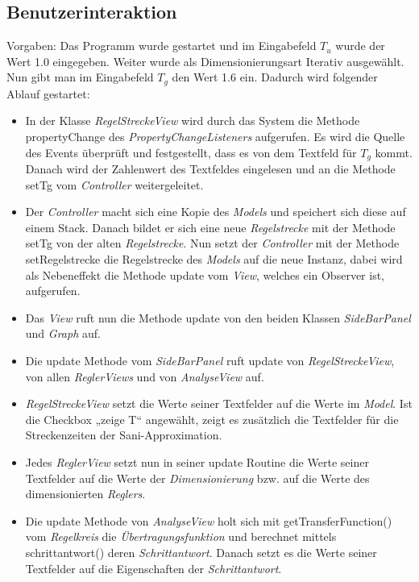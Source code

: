 \subsection{Benutzerinteraktion}
Vorgaben: Das Programm wurde gestartet und im Eingabefeld $T_u$ wurde der Wert 1.0 eingegeben. Weiter wurde als Dimensionierungsart Iterativ ausgewählt. Nun gibt man im Eingabefeld $T_g$ den Wert 1.6 ein. Dadurch wird folgender Ablauf gestartet:\\
\begin{itemize}
\item In der Klasse \textit{RegelStreckeView} wird durch das System die Methode propertyChange des \textit{PropertyChangeListeners} aufgerufen. Es wird die Quelle des Events überprüft und festgestellt, dass es von dem Textfeld für $T_g$ kommt. Danach wird der Zahlenwert des Textfeldes eingelesen und an die Methode setTg vom \textit{Controller} weitergeleitet.\\
\item Der \textit{Controller} macht sich eine Kopie des \textit{Models} und speichert sich diese auf einem Stack. Danach bildet er sich eine neue \textit{Regelstrecke} mit der Methode setTg von der alten \textit{Regelstrecke}. Nun setzt der \textit{Controller} mit der Methode setRegelstrecke die Regelstrecke des \textit{Models} auf die neue Instanz, dabei wird als Nebeneffekt die Methode update vom \textit{View}, welches ein Observer ist, aufgerufen. \\ 
\item Das \textit{View} ruft nun die Methode update von den beiden Klassen \textit{SideBarPanel} und \textit{Graph} auf.\\
\item Die update Methode vom \textit{SideBarPanel} ruft update von \textit{RegelStreckeView}, von allen \textit{ReglerViews} und von \textit{AnalyseView} auf.\\
\item \textit{RegelStreckeView} setzt die Werte seiner Textfelder auf die Werte im \textit{Model}. Ist die Checkbox „zeige T“ angewählt, zeigt es zusätzlich die Textfelder für die Streckenzeiten der Sani-Approximation.\\
\item Jedes \textit{ReglerView} setzt nun in seiner update Routine die Werte seiner Textfelder auf die Werte der \textit{Dimensionierung} bzw. auf die Werte des dimensionierten \textit{Reglers}.\\
\item Die update Methode von \textit{AnalyseView} holt sich mit getTransferFunction() vom \textit{Regelkreis} die \textit{Übertragungsfunktion} und berechnet mittels schrittantwort() deren \textit{Schrittantwort}. Danach setzt es die Werte seiner Textfelder auf die Eigenschaften der \textit{Schrittantwort}.\\

\end{itemize}
